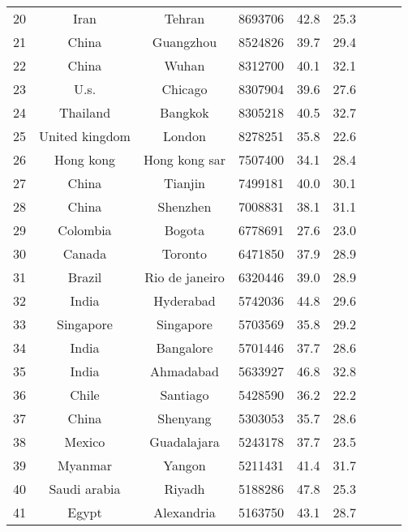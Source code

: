 \begin{table}
\begin{tabular}{ccccccccc}
  20 &                Iran &          Tehran &    8693706 &     42.8 &     25.3 \\
  21 &               China &       Guangzhou &    8524826 &     39.7 &     29.4 \\
  22 &               China &           Wuhan &    8312700 &     40.1 &     32.1 \\
  23 &                U.s. &         Chicago &    8307904 &     39.6 &     27.6 \\
  24 &            Thailand &         Bangkok &    8305218 &     40.5 &     32.7 \\
  25 &      United kingdom &          London &    8278251 &     35.8 &     22.6 \\
  26 &           Hong kong &   Hong kong sar &    7507400 &     34.1 &     28.4 \\
  27 &               China &         Tianjin &    7499181 &     40.0 &     30.1 \\
  28 &               China &        Shenzhen &    7008831 &     38.1 &     31.1 \\
  29 &            Colombia &          Bogota &    6778691 &     27.6 &     23.0 \\
  30 &              Canada &         Toronto &    6471850 &     37.9 &     28.9 \\
  31 &              Brazil &  Rio de janeiro &    6320446 &     39.0 &     28.9 \\
  32 &               India &       Hyderabad &    5742036 &     44.8 &     29.6 \\
  33 &           Singapore &       Singapore &    5703569 &     35.8 &     29.2 \\
  34 &               India &       Bangalore &    5701446 &     37.7 &     28.6 \\
  35 &               India &       Ahmadabad &    5633927 &     46.8 &     32.8 \\
  36 &               Chile &        Santiago &    5428590 &     36.2 &     22.2 \\
  37 &               China &        Shenyang &    5303053 &     35.7 &     28.6 \\
  38 &              Mexico &     Guadalajara &    5243178 &     37.7 &     23.5 \\
  39 &             Myanmar &          Yangon &    5211431 &     41.4 &     31.7 \\
  40 &        Saudi arabia &          Riyadh &    5188286 &     47.8 &     25.3 \\
  41 &               Egypt &      Alexandria &    5163750 &     43.1 &     28.7 \\

\end{tabular}
\end{table}
